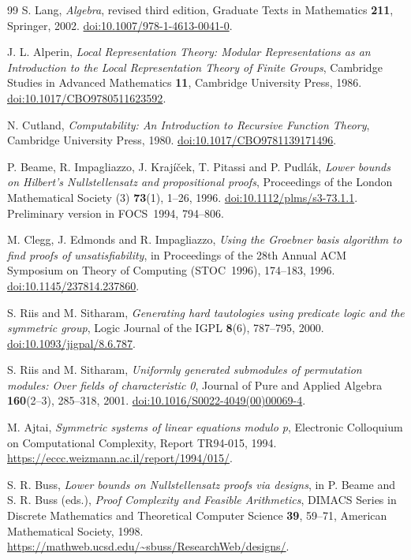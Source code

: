 \begin{thebibliography}{99}
S. Lang, \emph{Algebra}, revised third edition,
Graduate Texts in Mathematics \textbf{211}, Springer, 2002.
\href{https://doi.org/10.1007/978-1-4613-0041-0}{doi:10.1007/978-1-4613-0041-0}.

J. L. Alperin, \emph{Local Representation Theory:
Modular Representations as an Introduction to the Local
Representation Theory of Finite Groups},
Cambridge Studies in Advanced Mathematics \textbf{11},
Cambridge University Press, 1986.
\href{https://doi.org/10.1017/CBO9780511623592}{doi:10.1017/CBO9780511623592}.

N. Cutland, \emph{Computability: An Introduction to Recursive
Function Theory}, Cambridge University Press, 1980.
\href{https://doi.org/10.1017/CBO9781139171496}{doi:10.1017/CBO9781139171496}.


P. Beame, R. Impagliazzo, J. Kraj\'i\v cek, T. Pitassi and P. Pudl\'ak,
\emph{Lower bounds on Hilbert's Nullstellensatz and propositional proofs},
Proceedings of the London Mathematical Society (3)
\textbf{73}(1), 1--26, 1996.
\href{https://doi.org/10.1112/plms/s3-73.1.1}{doi:10.1112/plms/s3-73.1.1}.
Preliminary version in FOCS~1994, 794--806.

M. Clegg, J. Edmonds and R. Impagliazzo,
\emph{Using the Groebner basis algorithm to find proofs of unsatisfiability},
in Proceedings of the 28th Annual ACM Symposium on Theory of Computing
(STOC~1996), 174--183, 1996.
\href{https://doi.org/10.1145/237814.237860}{doi:10.1145/237814.237860}.

S. Riis and M. Sitharam,
\emph{Generating hard tautologies using predicate logic and the symmetric group},
Logic Journal of the IGPL \textbf{8}(6), 787--795, 2000.
\href{https://doi.org/10.1093/jigpal/8.6.787}{doi:10.1093/jigpal/8.6.787}.

S. Riis and M. Sitharam,
\emph{Uniformly generated submodules of permutation modules:
Over fields of characteristic 0},
Journal of Pure and Applied Algebra \textbf{160}(2--3), 285--318, 2001.
\href{https://doi.org/10.1016/S0022-4049(00)00069-4}{doi:10.1016/S0022-4049(00)00069-4}.

M. Ajtai, \emph{Symmetric systems of linear equations modulo p},
Electronic Colloquium on Computational Complexity, Report TR94-015, 1994.
\url{https://eccc.weizmann.ac.il/report/1994/015/}.

S. R. Buss, \emph{Lower bounds on Nullstellensatz proofs via designs},
in P. Beame and S. R. Buss (eds.), \emph{Proof Complexity and Feasible
Arithmetics}, DIMACS Series in Discrete Mathematics and Theoretical
Computer Science \textbf{39}, 59--71, American Mathematical Society, 1998.
\url{https://mathweb.ucsd.edu/~sbuss/ResearchWeb/designs/}.


\end{thebibliography}

